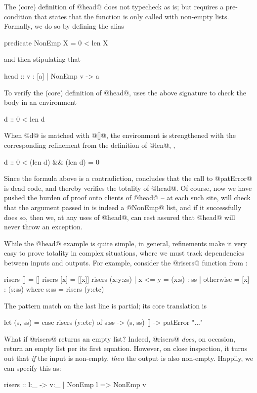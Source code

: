 The (core) definition of @head@ does not typecheck
as is; but requires a pre-condition that states that the function
is only called with non-empty lists. Formally, we do so by 
defining the alias
%
\begin{code}
  predicate NonEmp X = 0 < len X 
\end{code}
%
and then stipulating that 
%
\begin{code}
  head :: {v : [a] | NonEmp v} -> a
\end{code}
%
To verify the (core) definition of @head@, \toolname uses the above signature
to check the body in an environment
%
\begin{code}
  d :: {0 < len d}
\end{code}
%
When @d@ is matched with @[]@, the environment is 
strengthened with the corresponding refinement from 
the definition of @len@, \ie,
%
\begin{code}
  d :: {0 < (len d) && (len d) = 0}
\end{code}
%
Since the formula above is a contradiction, \toolname concludes that the
call to @patError@ is dead code, and thereby verifies the totality 
of @head@. Of course, now we have pushed the burden of proof onto clients
of @head@ -- at each such site, \toolname will check that the argument 
passed in is indeed a @NonEmp@ list, and if it successfully does so, then
we, at any uses of @head@, can rest assured that @head@ will never throw an 
exception. 

While the @head@ example is quite simple, in general, refinements make
it very easy to prove totality in complex situations, where we must track
dependencies between inputs and outputs. For example, consider the @risers@
function from \cite{catch}:
%
\begin{code}
  risers []       = []
  risers [x]      = [[x]]
  risers (x:y:zs) 
    | x <= y      = (x:s) : ss 
    | otherwise   = [x] : (s:ss) 
    where 
      s:ss    = risers (y:etc)
\end{code}
%
The pattern match on the last line is partial; its core translation is
%
\begin{code}
  let (s, ss) = case risers (y:etc) of
                  s:ss -> (s, ss)
                  []   -> patError "..."
\end{code}
%
What if @risers@ returns an empty list? 
Indeed, @risers@ \emph{does}, on occasion, return an empty list per its
first equation. However, on close inspection, it turns out that 
\emph{if} the input is non-empty, \emph{then} the output is also
non-empty. Happily, we can specify this as:
%
\begin{code}
  risers :: l:_ -> {v:_ | NonEmp l => NonEmp v} 
\end{code}

